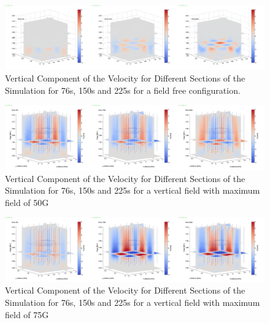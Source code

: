 \documentclass{aastex62}
\begin{document}
\begin{figure}[h]\label{vzplot_bv0g_76_150_225}
\includegraphics[scale=0.15]{imrescale/vz_bv0g_76_150_225.jpg}
\caption{Vertical Component of the Velocity for Different Sections of the Simulation for 76s, 150s and 225s for a field free configuration.}
\end{figure}

\begin{figure}[h]\label{vzplot_bv50g_76_150_225}
\includegraphics[scale=0.15]{imrescale/vz_bv50g_76_150_225.jpg}
\caption{Vertical Component of the Velocity for Different Sections of the Simulation for 76s, 150s and 225s for a vertical field with maximum field of 50G}
\end{figure}




\begin{figure}[h]\label{vzplot_bv75g_76_150_225}
\includegraphics[scale=0.15]{imrescale/vz_bv75g_76_150_225.jpg}
\caption{Vertical Component of the Velocity for Different Sections of the Simulation for 76s, 150s and 225s for a vertical field with maximum field of 75G}
\end{figure}
\end{document}
